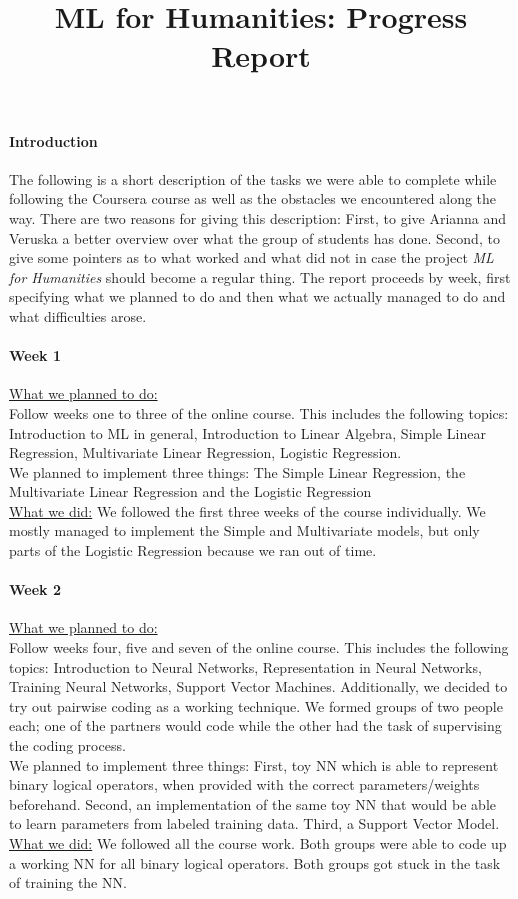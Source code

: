 \documentclass[•]{article}
\title{ML for Humanities: Progress Report}
\begin{document}
\maketitle
\paragraph{Introduction} The following is a short description of the tasks we were able to complete while following the Coursera course as well as the obstacles we encountered along the way. There are two reasons for giving this description: First, to give Arianna and Veruska a better overview over what the group of students has done. Second, to give some pointers as to what worked and what did not in case the project \emph{ML for Humanities} should become a regular thing. The report proceeds by week, first specifying what we planned to do and then what we actually managed to do and what difficulties arose.
\paragraph{Week 1} \underline{What we planned to do:}\\
Follow weeks one to three of the online course. This includes the following topics: Introduction to ML in general, Introduction to Linear Algebra, Simple Linear Regression, Multivariate Linear Regression, Logistic Regression.\\
We planned to implement three things: The Simple Linear Regression, the Multivariate Linear Regression and the Logistic Regression\\
\underline{What we did:} We followed the first three weeks of the course individually. We mostly managed to implement the Simple and Multivariate models, but only parts of the Logistic Regression because we ran out of time.
\paragraph{Week 2} \underline{What we planned to do:}\\
Follow weeks four, five and seven of the online course. This includes the following topics: Introduction to Neural Networks, Representation in Neural Networks, Training Neural Networks, Support Vector Machines. Additionally, we decided to try out pairwise coding as a working technique. We formed groups of two people each; one of the partners would code while the other had the task of supervising the coding process.\\
We planned to implement three things: First, toy NN which is able to represent binary logical operators, when provided with the correct parameters/weights beforehand. Second, an implementation of the same toy NN that would be able to learn parameters from labeled training data. Third, a Support Vector Model.\\
\underline{What we did:} We followed all the course work. Both groups were able to code up a working NN for all binary logical operators. Both groups got stuck in the task of training the NN.
\end{document}
